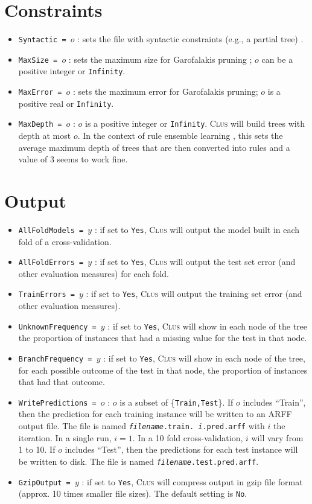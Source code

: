 \documentclass[a4paper]{report}
\newcommand{\clus}{\textsc{Clus}}
\begin{document}
\section{Constraints}

\begin{itemize}
\item {\tt Syntactic = $o$} : sets the file with syntactic constraints (e.g., a partial tree) \cite{Struyf06-KDID:proc}.
\item {\tt MaxSize = $o$} : sets the maximum size for Garofalakis pruning \cite{Garofalakis03:jrnl, Struyf06-KDID:proc}; $o$ can be a positive integer or {\tt Infinity}.
\item {\tt MaxError = $o$} : sets the maximum error for Garofalakis pruning; $o$ is a positive real or {\tt Infinity}.
\item {\tt MaxDepth = $o$} : $o$ is a positive integer or {\tt Infinity}. \clus{} will build trees with depth at most $o$. In the context of rule ensemble learning \cite{Aho2009}, this sets the average maximum depth of trees that are then converted into rules and a value of 3 seems to work fine.
\end{itemize}

\section{Output}

\begin{itemize}
\item {\tt AllFoldModels = $y$} : if set to {\tt Yes}, \clus{} will output the model built in each fold of a cross-validation.
\item {\tt AllFoldErrors = $y$} : if set to {\tt Yes}, \clus{} will output the test set error (and other evaluation measures) for each fold.
\item {\tt TrainErrors = $y$} : if set to {\tt Yes}, \clus{} will output the training set error (and other evaluation measures).
\item {\tt UnknownFrequency = $y$} : if set to {\tt Yes}, \clus{} will show in each node of the tree the proportion of instances that had a missing value for the test in that node.
\item {\tt BranchFrequency = $y$} : if set to {\tt Yes}, \clus{} will show in each node of the tree, for each possible outcome of the test in that node, the proportion of instances that had that outcome.
\item {\tt WritePredictions = $o$} : $o$ is a subset of \{\texttt{Train,Test}\}. If $o$ includes ``Train'', then the prediction for each training instance will be written to an ARFF output file. The file is named {\tt {\em filename}.train. {\em i}.pred.arff} with $i$ the iteration. In a single run, $i = 1$. In a 10 fold cross-validation, $i$ will vary from 1 to 10. If $o$ includes ``Test'', then the predictions for each test instance will be written to disk. The file is named {\tt {\em filename}.test.pred.arff}.
\item {\tt GzipOutput = $y$} : if set to {\tt Yes}, \clus{} will compress output in gzip file format (approx. 10 times smaller file sizes). The default setting is {\tt No}.
\end{itemize}
\end{document}
